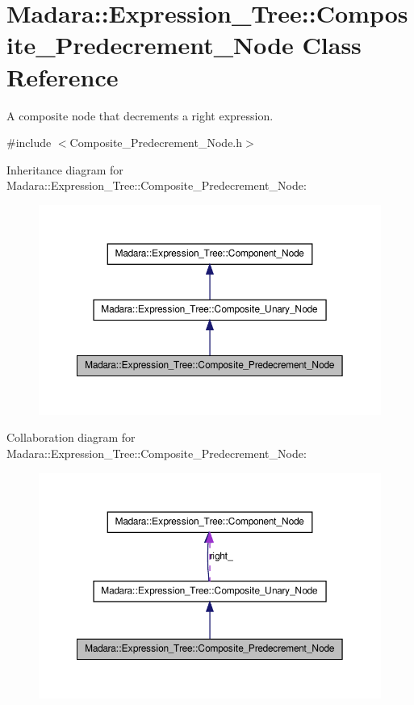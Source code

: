 \hypertarget{classMadara_1_1Expression__Tree_1_1Composite__Predecrement__Node}{
\section{Madara::Expression\_\-Tree::Composite\_\-Predecrement\_\-Node Class Reference}
\label{d5/d8a/classMadara_1_1Expression__Tree_1_1Composite__Predecrement__Node}
}


A composite node that decrements a right expression.  




{\ttfamily \#include $<$Composite\_\-Predecrement\_\-Node.h$>$}



Inheritance diagram for Madara::Expression\_\-Tree::Composite\_\-Predecrement\_\-Node:
\nopagebreak
\begin{figure}[H]
\begin{center}
\leavevmode
\includegraphics[width=356pt]{de/df1/classMadara_1_1Expression__Tree_1_1Composite__Predecrement__Node__inherit__graph}
\end{center}
\end{figure}


Collaboration diagram for Madara::Expression\_\-Tree::Composite\_\-Predecrement\_\-Node:
\nopagebreak
\begin{figure}[H]
\begin{center}
\leavevmode
\includegraphics[width=356pt]{d8/d09/classMadara_1_1Expression__Tree_1_1Composite__Predecrement__Node__coll__graph}
\end{center}
\end{figure}
